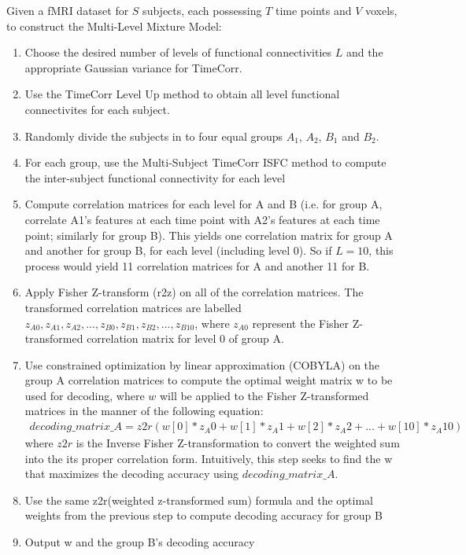 \documentclass[11pt]{article}
\begin{document}
Given a fMRI dataset for $S$ subjects, each possessing $T$ time points and $V$ voxels, to construct the Multi-Level Mixture Model:
\begin{enumerate}
\item Choose the desired number of levels of functional connectivities $L$ and the appropriate Gaussian variance for TimeCorr.
\item Use the TimeCorr Level Up method to obtain all level functional connectivites for each subject.
\item Randomly divide the subjects in to four equal groups $A_1$, $A_2$, $B_1$ and $B_2$.
\item For each group, use the Multi-Subject TimeCorr ISFC method to compute the inter-subject functional connectivity for each level
\item Compute correlation matrices for each level for A and B (i.e. for group A, correlate A1's features at each time point with A2's features at each time point; similarly for group B). This yields one correlation matrix for group A and another for group B, for each level (including level 0). So if $L=10$, this process would yield 11 correlation matrices for A and another 11 for B.
\item Apply Fisher Z-transform (r2z) on all of the correlation matrices. The transformed correlation matrices are labelled $z_{A0}, z_{A1}, z_{A2}, ..., z_{B0}, z_{B1}, z_{B2}, ..., z_{B10}$, where $z_{A0}$ represent the Fisher Z-transformed correlation matrix for level 0 of group A.
\item Use constrained optimization by linear approximation (COBYLA) on the group A correlation matrices to compute the optimal weight matrix w to be used for decoding, where $w$ will be applied to the Fisher Z-transformed matrices in the manner of the following equation:
\begin{align*}
decoding\_matrix\_A = z2r(w[0]*z_A0 + w[1]*z_A1 + w[2]*z_A2 + ... + w[10]*z_A10)
\end{align*}
where $z2r$ is the Inverse Fisher Z-transformation to convert the weighted sum into the its proper correlation form. Intuitively, this step seeks to find the w that maximizes the decoding accuracy using $decoding\_matrix\_A$.
\item Use the same z2r(weighted z-transformed sum) formula and the optimal weights from the previous step to compute decoding accuracy for group B
\item Output w and the group B's decoding accuracy
\end{enumerate}
\end{document}
